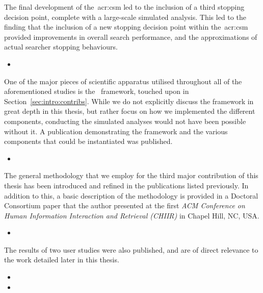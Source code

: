 The final development of the~\gls{acr:csm} led to the inclusion of a third stopping decision point, complete with a large-scale simulated analysis. This led to the finding that the inclusion of a new stopping decision point within the~\gls{acr:csm} provided improvements in overall search performance, and the approximations of actual searcher stopping behaviours.

\begin{itemize}
    \item{}
\end{itemize}

\noindent
{}
One of the major pieces of scientific apparatus utilised throughout all of the aforementioned studies is the \simiir~framework, touched upon in Section~\ref{sec:intro:contribs}. While we do not explicitly discuss the framework in great depth in this thesis, but rather focus on how we implemented the different components, conducting the simulated analyses would not have been possible without it. A publication demonstrating the framework and the various components that could be instantiated was published.

\begin{itemize}
    \item{}
\end{itemize}

\noindent
{}
The general methodology that we employ for the third major contribution of this thesis has been introduced and refined in the publications listed previously. In addition to this, a basic description of the methodology is provided in a Doctoral Consortium paper that the author presented at the first \emph{ACM Conference on Human Information Interaction and Retrieval (CHIIR)} in Chapel Hill, NC, USA.

\begin{itemize}
    \item{}
\end{itemize}

The results of two user studies were also published, and are of direct relevance to the work detailed later in this thesis.

\begin{itemize}
    \item{}
    \item{}
\end{itemize}

